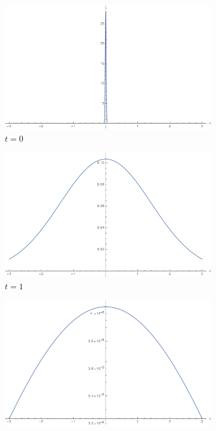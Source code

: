\documentclass[12pt]{article}
\begin{document}
\begin{figure}[H]
    \centering
    \begin{subfigure}[h]{0.4\textwidth}
        \includegraphics[width=\textwidth]{Part1Plots/t0}
        \caption{$t=0$}
        \label{fig:t0}
    \end{subfigure}
    \begin{subfigure}[h]{0.4\textwidth}
        \includegraphics[width=\textwidth]{Part1Plots/t1}
        \caption{$t=1$}
        \label{fig:t1}
    \end{subfigure}
    \begin{subfigure}[h]{0.4\textwidth}
        \includegraphics[width=\textwidth]{Part1Plots/t10}

\end{subfigure}
\end{figure}
\end{document}
